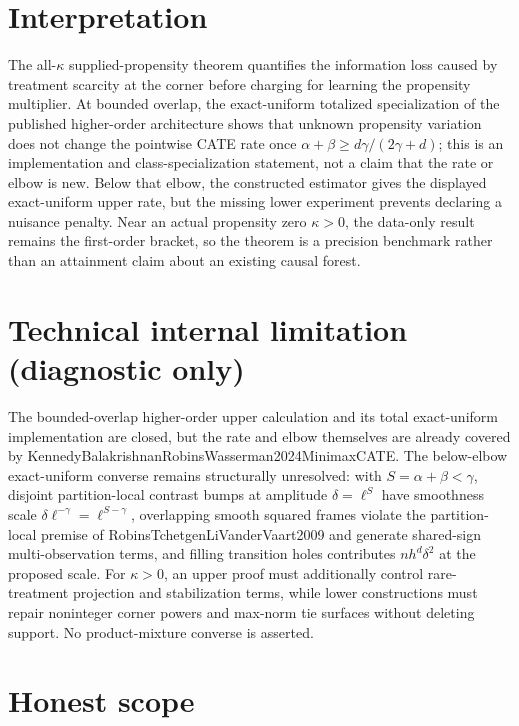 \documentclass{article}
\begin{document}
\section{Interpretation}

The all-\(\kappa\) supplied-propensity theorem quantifies the information loss caused by treatment scarcity at the corner before charging for learning the propensity multiplier.  At bounded overlap, the exact-uniform totalized specialization of the published higher-order architecture shows that unknown propensity variation does not change the pointwise CATE rate once \(\alpha+\beta\geq d\gamma/(2\gamma+d)\); this is an implementation and class-specialization statement, not a claim that the rate or elbow is new.  Below that elbow, the constructed estimator gives the displayed exact-uniform upper rate, but the missing lower experiment prevents declaring a nuisance penalty.  Near an actual propensity zero \(\kappa>0\), the data-only result remains the first-order bracket, so the theorem is a precision benchmark rather than an attainment claim about an existing causal forest.

\section*{Technical internal limitation (diagnostic only)}

The bounded-overlap higher-order upper calculation and its total exact-uniform implementation are closed, but the rate and elbow themselves are already covered by KennedyBalakrishnanRobinsWasserman2024MinimaxCATE.  The below-elbow exact-uniform converse remains structurally unresolved: with \(S=\alpha+\beta<\gamma\), disjoint partition-local contrast bumps at amplitude \(\delta=\ell^S\) have smoothness scale \(\delta\ell^{-\gamma}=\ell^{S-\gamma}\), overlapping smooth squared frames violate the partition-local premise of RobinsTchetgenLiVanderVaart2009 and generate shared-sign multi-observation terms, and filling transition holes contributes \(nh^d\delta^2\) at the proposed scale.  For \(\kappa>0\), an upper proof must additionally control rare-treatment projection and stabilization terms, while lower constructions must repair noninteger corner powers and max-norm tie surfaces without deleting support.  No product-mixture converse is asserted.

\section{Honest scope}
\end{document}
